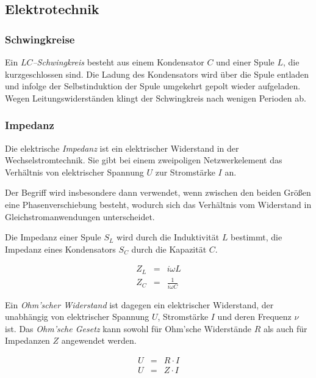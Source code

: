 \documentclass[12pt,a4paper]{scrartcl}
\numberwithin{equation}{section} %
\begin{document}
\hypertarget{elektrotechnik}{%
\subsection{Elektrotechnik}\label{elektrotechnik}}

\hypertarget{schwingkreise}{%
\subsubsection{Schwingkreise}\label{schwingkreise}}

Ein \emph{$LC$--Schwingkreis} besteht aus einem Kondensator $C$ und
einer Spule $L$, die kurzgeschlossen sind. Die Ladung des Kondensators
wird über die Spule entladen und infolge der Selbstinduktion der Spule
umgekehrt gepolt wieder aufgeladen. Wegen Leitungswiderständen klingt
der Schwingkreis nach wenigen Perioden ab.

\hypertarget{impedanz}{%
\subsubsection{Impedanz}\label{impedanz}}

Die elektrische \emph{Impedanz} ist ein elektrischer Widerstand in der
Wechselstromtechnik. Sie gibt bei einem zweipoligen Netzwerkelement das
Verhältnis von elektrischer Spannung $U$ zur Stromstärke $I$ an.

Der Begriff wird insbesondere dann verwendet, wenn zwischen den beiden
Größen eine Phasenverschiebung besteht, wodurch sich das Verhältnis vom
Widerstand in Gleichstromanwendungen unterscheidet.

Die Impedanz einer Spule $S_L$ wird durch die Induktivität $L$
bestimmt, die Impedanz eines Kondensators $S_C$ durch die Kapazität
$C$.

\begin{eqnarray}
    Z_L &=& i\omega L \\
    Z_C &=& \frac{1}{i\omega C}
\end{eqnarray}

Ein \emph{Ohm'scher Widerstand} ist dagegen ein elektrischer Widerstand,
der unabhängig von elektrischer Spannung $U$, Stromstärke $I$ und
deren Frequenz $\nu$ ist. Das \emph{Ohm'sche Gesetz} kann sowohl für
Ohm'sche Widerstände $R$ als auch für Impedanzen $Z$ angewendet
werden.

\begin{eqnarray}
    U &=& R\cdot I \\
    U &=& Z\cdot I
\end{eqnarray}
\end{document}
